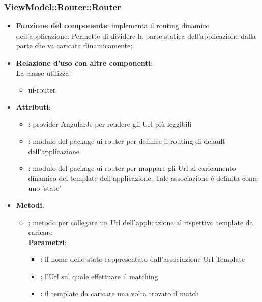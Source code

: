 \subsubsection{ViewModel::Router::Router}
\begin{itemize}
\item\textbf{Funzione del componente}: implementa il routing dinamico dell'applicazione. Permette di dividere la parte statica dell'applicazione dalla parte che va caricata dinamicamente;
	\item\textbf{Relazione d'uso con altre componenti}: \\
La classe utilizza:
	\begin{itemize}
		\item ui-router
	\end{itemize}
\item\textbf{Attributi}:
	\begin{itemize}
		\item{}: provider AngularJs per rendere gli Url più leggibili\\
		\item{}: modulo del package ui-router per definire il routing di default dell'applicazione\\
		\item{}: modulo del package ui-router per mappare gli Url al caricamento dinamico dei template dell'applicazione. Tale associazione è definita come uno 'state'\\
	\end{itemize}
\item\textbf{Metodi}:
	\begin{itemize}
		\item{}: metodo per collegare un Url dell'applicazione al rispettivo template da caricare\\
		\textbf{Parametri}:
			\begin{itemize}
				\item{}: il nome dello stato rappresentato dall'associazione Url-Template\\
				\item{}: l'Url sul quale effettuare il matching\\
				\item{}: il template da caricare una volta trovato il match\\
			\end{itemize}
	\end{itemize}
\end{itemize}